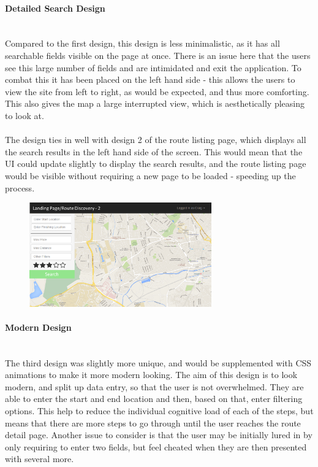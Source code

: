 \paragraph{Detailed Search Design}\ \\
Compared to the first design, this design is less minimalistic, as it has all searchable fields visible on the page at once. There is an issue here that the users see this large number of fields and are intimidated and exit the application. To combat this it has been placed on the left hand side - this allows the users to view the site from left to right, as would be expected, and thus more comforting. This also gives the map a large interrupted view, which is aesthetically pleasing to look at.\ \\
\ \\
The design ties in well with design 2 of the route listing page, which displays all the search results in the left hand side of the screen. This would mean that the UI could update slightly to display the search results, and the route listing page would be visible without requiring a new page to be loaded - speeding up the process.
\begin{figure}[!ht]
	\begin{center}
		\includegraphics[width=0.70\textwidth]{images/ui-landing-2.png}
	\end{center}
	\vspace{-9mm}
\end{figure}

\paragraph{Modern Design}\ \\
The third design was slightly more unique, and would be supplemented with CSS animations to make it more modern looking. The aim of this design is to look modern, and split up data entry, so that the user is not overwhelmed. They are able to enter the start and end location and then, based on that, enter filtering options. This help to reduce the individual cognitive load of each of the steps, but means that there are more steps to go through until the user reaches the route detail page. Another issue to consider is that the user may be initially lured in by only requiring to enter two fields, but feel cheated when they are then presented with several more.


